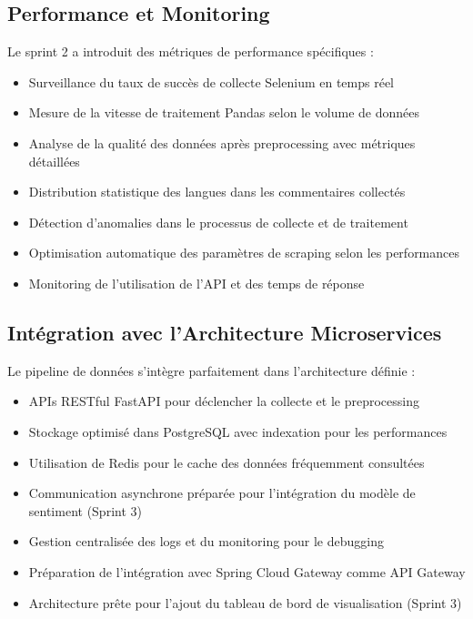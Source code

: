 \subsection{Performance et Monitoring}

Le sprint 2 a introduit des métriques de performance spécifiques :
\begin{itemize}
    \item Surveillance du taux de succès de collecte Selenium en temps réel
    \item Mesure de la vitesse de traitement Pandas selon le volume de données
    \item Analyse de la qualité des données après preprocessing avec métriques détaillées
    \item Distribution statistique des langues dans les commentaires collectés
    \item Détection d'anomalies dans le processus de collecte et de traitement
    \item Optimisation automatique des paramètres de scraping selon les performances
    \item Monitoring de l'utilisation de l'API et des temps de réponse
\end{itemize}

\subsection{Intégration avec l'Architecture Microservices}

Le pipeline de données s'intègre parfaitement dans l'architecture définie :
\begin{itemize}
    \item APIs RESTful FastAPI pour déclencher la collecte et le preprocessing
    \item Stockage optimisé dans PostgreSQL avec indexation pour les performances
    \item Utilisation de Redis pour le cache des données fréquemment consultées
    \item Communication asynchrone préparée pour l'intégration du modèle de sentiment (Sprint 3)
    \item Gestion centralisée des logs et du monitoring pour le debugging
    \item Préparation de l'intégration avec Spring Cloud Gateway comme API Gateway
    \item Architecture prête pour l'ajout du tableau de bord de visualisation (Sprint 3)
\end{itemize}

